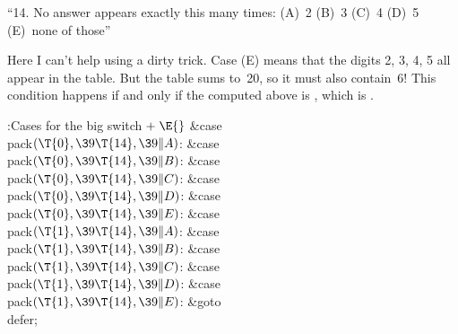 ``14. No answer appears exactly this many times:
(A)~2 (B)~3 (C)~4 (D)~5 (E)~none of those''

Here I can't help using a dirty trick. Case (E) means that the digits
2, 3, 4, 5 all appear in the  table. But the  table
sums
to~20, so it must also contain~6! This condition happens if and only if
the  computed above is ,
which is .

\Y\B\4:Cases for the big switch\X${}\mathrel+\E{}$\6
\4\&{case} \\{pack}${}(\T{0},\39\T{14},\39\|A){}$:\5
\&{case} \\{pack}${}(\T{0},\39\T{14},\39\|B){}$:\5
\&{case} \\{pack}${}(\T{0},\39\T{14},\39\|C){}$:\5
\&{case} \\{pack}${}(\T{0},\39\T{14},\39\|D){}$:\5
\&{case} \\{pack}${}(\T{0},\39\T{14},\39\|E){}$:\5
\&{case} \\{pack}${}(\T{1},\39\T{14},\39\|A){}$:\5
\&{case} \\{pack}${}(\T{1},\39\T{14},\39\|B){}$:\5
\&{case} \\{pack}${}(\T{1},\39\T{14},\39\|C){}$:\5
\&{case} \\{pack}${}(\T{1},\39\T{14},\39\|D){}$:\5
\&{case} \\{pack}${}(\T{1},\39\T{14},\39\|E){}$:\5
\&{goto} \\{defer};\par
\fi

